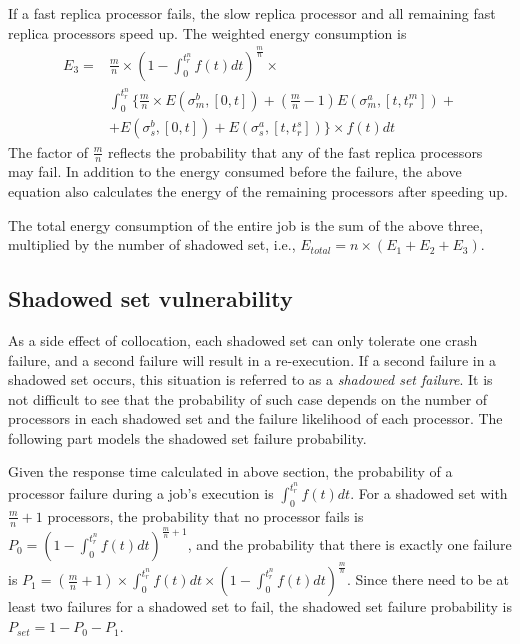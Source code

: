 If a fast replica processor fails, the slow replica processor and all remaining fast replica processors speed up. The weighted energy consumption is 
\begin{equation}
\begin{split}
E_3 = & \frac{m}{n} \times (1-\int_{0}^{t_r^n} f(t)dt)^{\frac{m}{n}}  \times \\
      & \int_{0}^{t_r^n} \{\frac{m}{n} \times E(\sigma_m^b, [0,t]) + (\frac{m}{n}-1)E(\sigma_m^a,[t, t_r^m]) + \\ 
      & +E(\sigma_s^b, [0,t])+E(\sigma_s^a, [t,t_r^s])\} \times f(t)dt
\end{split}
\end{equation}  
The factor of $\frac{m}{n}$ reflects the probability that any of the fast replica processors may fail. In addition to the energy consumed before the failure, the above equation also calculates the energy of the remaining processors after speeding up. 

The total energy consumption of the entire job is the sum of the above three, multiplied by the number of shadowed set, i.e., $E_{total}=n \times (E_1+E_2+E_3)$.

\subsection{Shadowed set vulnerability}
As a side effect of collocation, each shadowed set can only tolerate one crash failure, and a second failure will result in a re-execution.  If a second failure in a shadowed set occurs, this situation is referred to as a \textit{shadowed set failure}. It is not difficult to see that the probability of such case depends on the number of processors in each shadowed set and the failure likelihood of each processor. The following part models the shadowed set failure probability. 

Given the response time calculated in above section, the probability of a processor failure during a job's execution is $\int_{0}^{t_r^n} f(t)dt$. For a shadowed set with $\frac{m}{n}+1$ processors, the probability that no processor fails is $P_0=(1-\int_{0}^{t_r^n} f(t)dt)^{\frac{m}{n}+1}$, and the probability that there is exactly one failure is $P_1 = (\frac{m}{n}+1) \times \int_{0}^{t_r^n} f(t)dt \times (1-\int_{0}^{t_r^n} f(t)dt)^{\frac{m}{n}}$.
Since there need to be at least two failures for a shadowed set to fail, the shadowed set failure probability is $P_{set} = 1 - P_0 - P_1$. 


